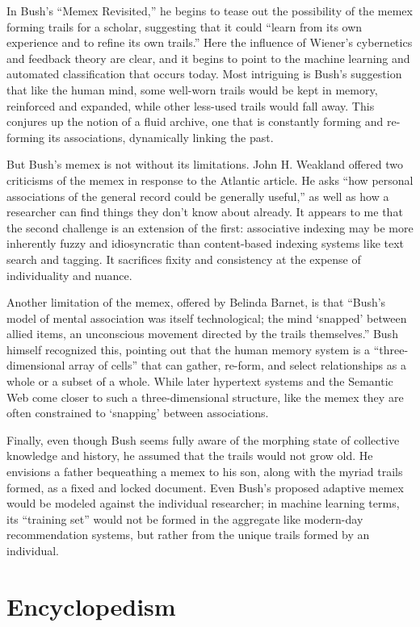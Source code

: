 In Bush’s “Memex Revisited,” he begins to tease out the possibility of the memex forming trails for a scholar, suggesting that it could “learn from its own experience and to refine its own trails.”  Here the influence of Wiener’s cybernetics and feedback theory are clear, and it begins to point to the machine learning and automated classification that occurs today. Most intriguing is Bush’s suggestion that like the human mind, some well-worn trails would be kept in memory, reinforced and expanded, while other less-used trails would fall away. This conjures up the notion of a fluid archive, one that is constantly forming and re-forming its associations, dynamically linking the past.

But Bush’s memex is not without its limitations. John H. Weakland offered two criticisms of the memex in response to the Atlantic article. He asks “how personal associations of the general record could be generally useful,” as well as how a researcher can find things they don’t know about already.  It appears to me that the second challenge is an extension of the first: associative indexing may be more inherently fuzzy and idiosyncratic than content-based indexing systems like text search and tagging. It sacrifices fixity and consistency at the expense of individuality and nuance.

Another limitation of the memex, offered by Belinda Barnet, is that “Bush’s model of mental association was itself technological; the mind ‘snapped’ between allied items, an unconscious movement directed by the trails themselves.”  Bush himself recognized this, pointing out that the human memory system is a “three-dimensional array of cells” that can gather, re-form, and select relationships as a whole or a subset of a whole.  While later hypertext systems and the Semantic Web come closer to such a three-dimensional structure, like the memex they are often constrained to ‘snapping’ between associations.

Finally, even though Bush seems fully aware of the morphing state of collective knowledge and history, he assumed that the trails would not grow old. He envisions a father bequeathing a memex to his son, along with the myriad trails formed, as a fixed and locked document. Even Bush’s proposed adaptive memex would be modeled against the individual researcher; in machine learning terms, its “training set” would not be formed in the aggregate like modern-day recommendation systems, but rather from the unique trails formed by an individual.

\section{Encyclopedism}


